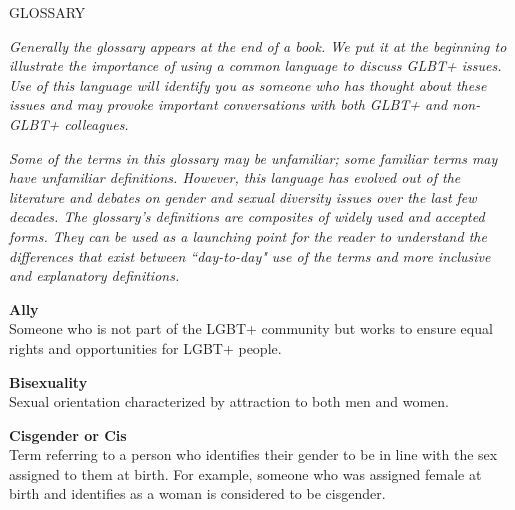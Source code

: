 %
\begin{titlepage}
\setcounter{page}{7}
\hfill\Large{GLOSSARY}
\label{glossary}		%
\normalsize			%
\vspace*{\baselineskip}

\emph{Generally the glossary appears at the end of a book.  We put it at the beginning to illustrate the importance of using a common language to discuss GLBT+ issues. Use of this language will identify you as someone who has thought about these issues and may provoke important conversations with both GLBT+ and non-GLBT+ colleagues.}
\vspace*{\baselineskip}

\emph{Some of the terms in this glossary may be unfamiliar; some familiar terms may have unfamiliar definitions. However, this language has evolved out of the literature and debates on gender and sexual diversity issues over the last few decades. The glossary's definitions are composites of widely used and accepted forms. They can be used as a launching point for the reader to understand the differences that exist between ``day-to-day" use of the terms and more inclusive and explanatory definitions.}
\vspace*{\baselineskip}

\noindent\textbf{Ally}\\
Someone who is not part of the LGBT+ community but works to ensure equal rights and opportunities for LGBT+ people.\vspace*{\baselineskip}

\noindent\textbf{Bisexuality}\\
Sexual orientation characterized by attraction to both men and women.\vspace*{\baselineskip}

\noindent\textbf{Cisgender or Cis}\\
Term referring to a person who identifies their gender to be in line with the sex assigned to them at birth. For example, someone who was assigned female at birth and identifies as a woman is considered to be cisgender.\vspace*{\baselineskip}


\end{titlepage}
